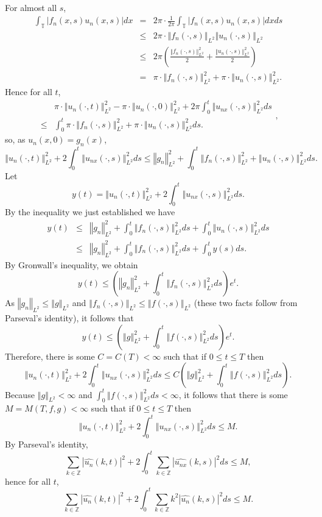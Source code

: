 \documentclass{amsart}
\newcommand{\norm}[1]{\left\Vert #1 \right\Vert}
\begin{document}
For almost all $s$,
\begin{eqnarray*}
 \int_\mathbb{T} |f_n(x,s) u_n(x,s)| dx &=& 
 2\pi \cdot \frac{1}{2\pi}  \int_\mathbb{T} |f_n(x,s) u_n(x,s)| dx ds\\
 & \leq& 
 2\pi \cdot \norm{f_n(\cdot,s)}_{L^2} \norm{u_n(\cdot,s)}_{L^2}\\
 &\leq&2\pi \left( \frac{ \norm{f_n(\cdot,s)}_{L^2}^2}{2} + \frac{\norm{u_n(\cdot,s)}_{L^2}^2}{2} \right)\\
 &=&\pi \cdot  \norm{f_n(\cdot,s)}_{L^2}^2 + \pi\cdot \norm{u_n(\cdot,s)}_{L^2}^2.
\end{eqnarray*}
Hence for all $t$,
\[
\begin{split}
&\pi \cdot \norm{u_n(\cdot,t)}_{L^2}^2 - \pi \cdot \norm{u_n(\cdot,0)}_{L^2}^2
+ 2\pi \int_0^t \norm{u_{nx}(\cdot,s)}_{L^2}^2 ds\\
 \leq& \int_0^t \pi \cdot  \norm{f_n(\cdot,s)}_{L^2}^2 + \pi\cdot \norm{u_n(\cdot,s)}_{L^2}^2 ds.
 \end{split},
\]
so, as $u_n(x,0)=g_n(x)$,
\[
 \norm{u_n(\cdot,t)}_{L^2}^2+2 \int_0^t \norm{u_{nx}(\cdot,s)}_{L^2}^2 ds \leq  \norm{g_n}_{L^2}^2 +  \int_0^t  \norm{f_n(\cdot,s)}_{L^2}^2  + \norm{u_n(\cdot,s)}_{L^2}^2 ds.
\]
Let
\[
y(t)= \norm{u_n(\cdot,t)}_{L^2}^2+2 \int_0^t \norm{u_{nx}(\cdot,s)}_{L^2}^2 ds.
\]
By the inequality we just established we have
\begin{eqnarray*}
y(t)& \leq&   \norm{g_n}_{L^2}^2 +  \int_0^t  \norm{f_n(\cdot,s)}_{L^2}^2 ds +\int_0^t \norm{u_n(\cdot,s)}_{L^2}^2 ds\\
&\leq&   \norm{g_n}_{L^2}^2 +  \int_0^t  \norm{f_n(\cdot,s)}_{L^2}^2 ds + \int_0^t y(s) ds.
\end{eqnarray*}
By Gronwall's inequality, we obtain
\[
 y(t) \leq \left(\norm{g_n}_{L^2}^2 + \int_0^t  \norm{f_n(\cdot,s)}_{L^2}^2 ds \right) e^t.
\]
As $\norm{g_n}_{L^2} \leq \norm{g}_{L^2}$ and $\norm{f_n(\cdot,s)}_{L^2} \leq \norm{f(\cdot,s)}_{L^2}$ (these two
facts follow from Parseval's identity), it follows that
\[
 y(t) \leq \left(\norm{g}_{L^2}^2 + \int_0^t  \norm{f(\cdot,s)}_{L^2}^2 ds \right) e^t.
\]
Therefore, there is some $C=C(T)<\infty$ such that if $0 \leq t \leq T$ then
\[
\norm{u_n(\cdot,t)}_{L^2}^2+2 \int_0^t \norm{u_{nx}(\cdot,s)}_{L^2}^2 ds \leq C  \left(\norm{g}_{L^2}^2 + \int_0^t  \norm{f(\cdot,s)}_{L^2}^2 ds \right).
\]
Because $\norm{g}_{L^2} < \infty$ and $\int_0^t  \norm{f(\cdot,s)}_{L^2}^2 ds<\infty$, it follows that there is some $M=M(T,f,g)<\infty$ such that 
if $0 \leq t \leq T$ then
\[
\norm{u_n(\cdot,t)}_{L^2}^2+2 \int_0^t \norm{u_{nx}(\cdot,s)}_{L^2}^2 ds \leq M.
\]
By Parseval's identity,
\[
\sum_{k \in \mathbb{Z}} |\widehat{u_n}(k,t)|^2+2\int_0^t \sum_{k \in \mathbb{Z}} |\widehat{u_{nx}}(k,s)|^2 ds \leq M,
\] 
hence for all $t$,
\[
\sum_{k \in \mathbb{Z}} |\widehat{u_n}(k,t)|^2+2\int_0^t \sum_{k \in \mathbb{Z}} k^2 |\widehat{u_n}(k,s)|^2 ds \leq M.
\]
\end{document}
